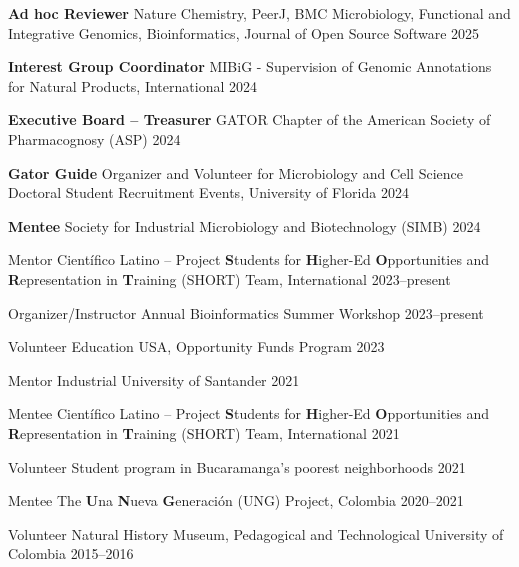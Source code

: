 {}
\begin{cvhonors}

\cvhonor
{\textbf{Ad hoc Reviewer}}
{Nature Chemistry, PeerJ, BMC Microbiology, Functional and Integrative Genomics, Bioinformatics, Journal of Open Source Software}
{2025}

\cvhonor
{\textbf{Interest Group Coordinator}}
{MIBiG - Supervision of Genomic Annotations for Natural Products, International}
{2024}

\cvhonor
{\textbf{Executive Board -- Treasurer}}
{GATOR Chapter of the American Society of Pharmacognosy (ASP)}
{2024}

\cvhonor
{\textbf{Gator Guide}}
{Organizer and Volunteer for Microbiology and Cell Science Doctoral Student Recruitment Events, University of Florida}
{2024}

\cvhonor
{\textbf{Mentee}}
{Society for Industrial Microbiology and Biotechnology (SIMB)}
{2024}

\end{cvhonors} \begin{cvhonors}


\cvhonor
{Mentor}
{Científico Latino – Project \textbf{S}tudents for \textbf{H}igher-Ed \textbf{O}pportunities and \textbf{R}epresentation in \textbf{T}raining (SHORT) Team, International}
{2023--present}

\cvhonor
{Organizer/Instructor}
{Annual Bioinformatics Summer Workshop}
{2023--present}

\cvhonor
{Volunteer}
{Education USA, Opportunity Funds Program}
{2023}

\cvhonor
{Mentor}
{Industrial University of Santander}
{2021}

\cvhonor
{Mentee}
{Científico Latino – Project \textbf{S}tudents for \textbf{H}igher-Ed \textbf{O}pportunities and \textbf{R}epresentation in \textbf{T}raining (SHORT) Team, International}
{2021}

\cvhonor
{Volunteer}
{Student program in Bucaramanga's poorest neighborhoods}
{2021}

\cvhonor
{Mentee}
{The \textbf{U}na \textbf{N}ueva \textbf{G}eneración (UNG) Project, Colombia}
{2020--2021}

\cvhonor
{Volunteer}
{Natural History Museum, Pedagogical and Technological University of Colombia}
{2015--2016}

\end{cvhonors}
